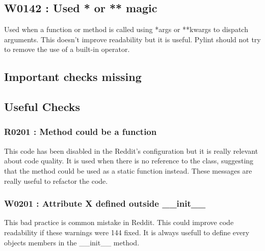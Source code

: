 \documentclass[11pt, a4paper]{article}
\newcommand{\pyl}{\textsf{Pylint}}
\begin{document}
\subsection*{W0142 : Used * or ** magic}

Used when a function or method is called using *args or **kwargs to dispatch arguments. 
This doesn't improve readability but it is useful.
\pyl{} should not try to remove the use of a built-in operator.

\subsection*{Important checks missing}

\subsection*{Useful Checks}

\subsubsection*{R0201 : Method could be a function}

This code has been disabled in the Reddit's configuration but it is really relevant about code quality. 
It is used when there is no reference to the class, suggesting that the method could be used as a static function instead.
These messages are really useful to refactor the code.

\subsubsection*{W0201 : Attribute X defined outside __init__}

This bad practice is common mistake in Reddit.
This could improve code readability if these warnings were 144 fixed.
It is always usefull to define every objects members in the __init__ method.
\end{document}
